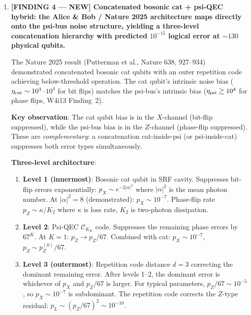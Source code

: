\documentclass[11pt]{article}
\theoremstyle{definition}
\theoremstyle{remark}
\newcommand{\CK}{\mathcal{C}_K}
\begin{document}
\begin{tcolorbox}[colback=blue!5!white, colframe=blue!60!black,
  title=\textbf{W4i14 TOP 5 FINDINGS --- READ FIRST}]
\begin{enumerate}[nosep]
\item \textbf{[FINDING 4 --- NEW] Concatenated bosonic cat + psi-QEC hybrid:
  the Alice \& Bob / Nature 2025 architecture maps directly onto the
  psi-bus noise structure, yielding a three-level concatenation hierarchy
  with predicted $10^{-15}$ logical error at $\sim 130$ physical qubits.}

  The Nature 2025 result (Putterman et al., Nature 638, 927--934)
  demonstrated concatenated bosonic cat qubits with an outer repetition
  code achieving below-threshold operation.  The cat qubit's intrinsic
  noise bias ($\eta_{\rm cat} \sim 10^3$--$10^4$ for bit flips) matches
  the psi-bus's intrinsic bias ($\eta_{\rm psi} \gtrsim 10^4$ for
  phase flips, W4i13 Finding~2).

  \textbf{Key observation}: The cat qubit bias is in the $X$-channel
  (bit-flip suppressed), while the psi-bus bias is in the $Z$-channel
  (phase-flip suppressed).  These are \emph{complementary}: a
  concatenation cat-inside-psi (or psi-inside-cat) suppresses both
  error types simultaneously.

  \textbf{Three-level architecture}:
  \begin{enumerate}[nosep]
    \item \textbf{Level 1 (innermost)}: Bosonic cat qubit in SRF cavity.
      Suppresses bit-flip errors exponentially: $p_X \sim e^{-2|\alpha|^2}$
      where $|\alpha|^2$ is the mean photon number.  At $|\alpha|^2 = 8$
      (demonstrated): $p_X \sim 10^{-7}$.  Phase-flip rate $p_Z \sim
      \kappa/K_2$ where $\kappa$ is loss rate, $K_2$ is two-photon
      dissipation.
    \item \textbf{Level 2}: Psi-QEC $\CK_K$ code.  Suppresses the
      remaining phase errors by $67^K$.  At $K = 1$: $p_Z \to p_Z/67$.
      Combined with cat: $p_X \sim 10^{-7}$, $p_Z \sim p_Z^{(0)}/67$.
    \item \textbf{Level 3 (outermost)}: Repetition code distance $d = 3$
      correcting the dominant remaining error.  After levels 1--2, the
      dominant error is whichever of $p_X$ and $p_Z/67$ is larger.
      For typical parameters, $p_Z/67 \sim 10^{-5}$, so $p_X \sim 10^{-7}$
      is subdominant.  The repetition code corrects the $Z$-type residual:
      $p_L \sim (p_Z/67)^2 \sim 10^{-10}$.
  \end{enumerate}


\end{enumerate}
\end{tcolorbox}
\end{document}
